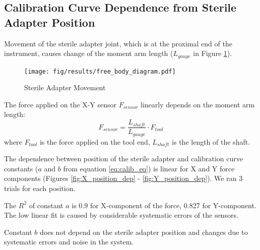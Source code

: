 \subsection{Calibration Curve Dependence from Sterile Adapter Position}
	\label{sec:DisExp}
	
Movement of the sterile adapter joint, which is at the proximal end of the instrument, causes change of the moment arm length ($L_{gauge}$ in Figure \ref{fig:Free_Body_Diagram}).	 	

\begin{figure}[h]
	\begin{center}
	\texttt{[image: fig/results/free\_body\_diagram.pdf]}
	\end{center}
	\vspace{-4mm}
	\caption[Sterile Adapter Movement]
	{Sterile Adapter Movement}
	\label{fig:Free_Body_Diagram}
	\vspace{-2mm}
\end{figure}

	The force applied on the X-Y sensor $F_{sensor}$ linearly depends on the moment arm length:
	\begin{equation}
	F_{sensor} = \frac{L_{shaft}}{L_{gauge}} \cdot F_{tool}
	\end{equation}
	where $F_{tool}$ is the force applied on the tool end, $L_{shaft}$ is the length of the shaft.

The dependence between position of the sterile adapter and calibration curve constants ($a$ and $b$ from equation \ref{eq:calib_eq}) is linear for X and Y force components (Figures \ref{fig:X_position_dep} - \ref{fig:Y_position_dep}). We ran 3 trials for each position.

The $R^2$ of constant $a$ is 0.9 for X-component of the force, 0.827 for Y-component. The low linear fit is caused by considerable systematic errors of the sensors.

Constant $b$ does not depend on the sterile adapter position and changes due to systematic errors and noise in the system.

